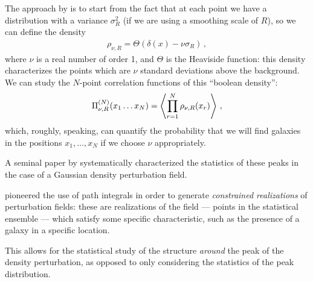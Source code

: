 \documentclass[main.tex]{subfiles}
\begin{document}
The approach by \textcite[]{matarresePathintegralApproachLargescale1986} is to start from the fact that at each point we have a distribution with a variance \(\sigma_R^2\) (if we are using a smoothing scale of \(R\)), so we can define the density 
%
\begin{align}
\rho_{\nu , R} = \Theta (\delta (x) - \nu \sigma _R)
\,,
\end{align}
%
where \(\nu \) is a real number of order 1, and \(\Theta \) is the Heaviside function: this density characterizes the points which are \(\nu \) standard deviations above the background. 
We can study the \(N\)-point correlation functions of this ``boolean density'': 
%
\begin{align}
\Pi^{(N)}_{\nu , R} (x_1 \dots x_N) = \expval{ \prod_{r=1}^{N} \rho _{\nu , R} (x_r)}
\,,
\end{align}
%
which, roughly, speaking, can quantify the probability that we will find galaxies in the positions \(x_1, \dots, x_N\) if we choose \(\nu \) appropriately. 

A seminal paper by \textcite[]{bardeenStatisticsPeaksGaussian1986} systematically characterized the statistics of these peaks in the case of a Gaussian density perturbation field.



\textcite[]{bertschingerPathIntegralMethods1987} pioneered the use of path integrals in order to generate \emph{constrained realizations} of perturbation fields: these are realizations of the field --- points in the statistical ensemble --- which satisfy some specific characteristic, such as the presence of a galaxy in a specific location. 

This allows for the statistical study of the structure \emph{around} the peak of the density perturbation, as opposed to only considering the statistics of the peak distribution. 

\end{document}
